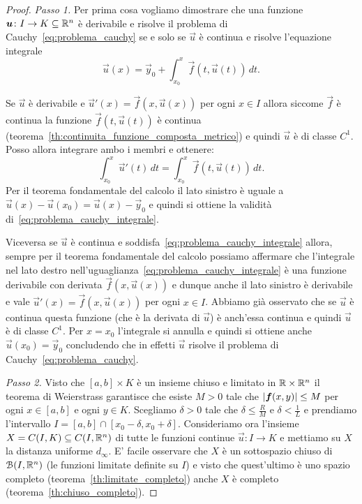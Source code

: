 \begin{proof}
  \emph{Passo 1.}
  Per prima cosa vogliamo dimostrare che una funzione $\boldsymbol u\colon I\to K\subseteq {\mathbb R}^n$
  è derivabile e risolve il problema di Cauchy~\eqref{eq:problema_cauchy} 
  se e solo se 
  $\vec u$ è continua e risolve l'equazione integrale
  \begin{equation}\label{eq:problema_cauchy_integrale}
  \vec u(x) = \vec y_0 + \int_{x_0}^x \vec f(t,\vec u(t))\, dt.
  \end{equation}

  Se $\vec u$ è derivabile e 
  $\vec u'(x) = \vec f(x, \vec u(x))$ per ogni $x\in I$ allora 
  siccome $\vec f$ è continua la funzione $\vec f(t,\vec u(t))$ è continua 
  (teorema~\ref{th:continuita_funzione_composta_metrico})
  e quindi $\vec u$ è di classe $C^1$. 
  Posso allora integrare ambo i membri 
  e ottenere:
  \[
   \int_{x_0}^x \vec u'(t)\, dt = \int_{x_0}^x \vec f(t,\vec u(t))\, dt.  
  \]
  Per il teorema fondamentale del calcolo il lato sinistro è uguale 
  a $\vec u(x) - \vec u(x_0) = \vec u(x) - \vec y_0$ e quindi si ottiene 
  la validità di~\eqref{eq:problema_cauchy_integrale}.

  Viceversa se $\vec u$ è continua e soddisfa~\eqref{eq:problema_cauchy_integrale}
  allora, sempre per il teorema fondamentale del calcolo possiamo affermare
  che l'integrale nel lato destro nell'uguaglianza~\eqref{eq:problema_cauchy_integrale}
  è una funzione derivabile con derivata $\vec f(x,\vec u(x))$ e dunque anche 
  il lato sinistro è derivabile e vale $\vec u'(x) = \vec f(x,\vec u(x))$ per 
  ogni $x\in I$. 
  Abbiamo già osservato che se $\vec u$ è continua questa funzione (che è la derivata 
  di $\vec u$) è anch'essa continua e quindi $\vec u$ è di classe $C^1$.
  Per $x=x_0$ l'integrale si annulla e quindi si ottiene 
  anche $\vec u(x_0) = \vec y_0$ concludendo che in effetti $\vec u$ risolve 
  il problema di Cauchy~\eqref{eq:problema_cauchy}.

  \emph{Passo 2.}
  Visto che $[a,b]\times K$ è un insieme chiuso e limitato in ${\mathbb R} \times {\mathbb R}^n$ 
  il teorema di Weierstrass garantisce che esiste $M>0$ tale che 
  ${\left|\boldsymbol f(x,y)\right|}\le M$ per ogni $x\in [a,b]$ e ogni $y\in K$.
  Scegliamo $\delta >0$ tale che $\delta \le \frac{R}{M}$ e $\delta < \frac {1}{L}$
  e prendiamo l'intervallo $I = [a,b]\cap [x_0-\delta,x_0+\delta]$.
  Consideriamo ora l'insieme $X=C(I,K)\subseteq C(I,{\mathbb R}^n)$ di tutte le funzioni continue $\vec u\colon I\to K$
  e mettiamo su $X$ la distanza uniforme $d_\infty$.
  E' facile osservare che $X$ è un sottospazio chiuso di $\mathcal B(I,{\mathbb R}^n)$ (le funzioni limitate definite su $I$)
  e visto che quest'ultimo è uno spazio completo (teorema~\ref{th:limitate_completo}) anche $X$ 
  è completo (teorema~\ref{th:chiuso_completo}).


\end{proof}

